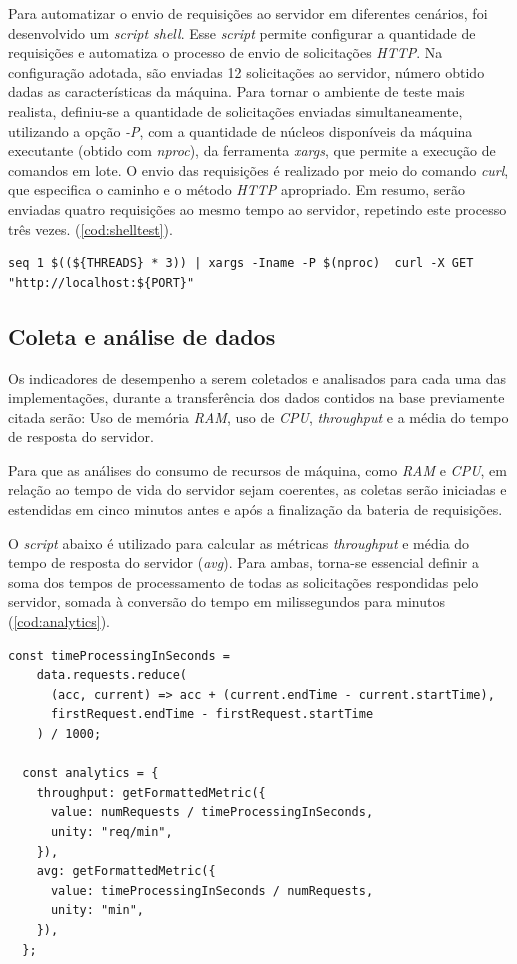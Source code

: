 \documentclass[12pt]{article}
\begin{document}
Para automatizar o envio de requisições ao servidor em diferentes cenários, 
foi desenvolvido um \textit{script shell}. Esse \textit{script} permite configurar a quantidade de 
requisições e automatiza o processo de envio de solicitações \textit{HTTP}. Na configuração adotada,
são enviadas 12 solicitações ao servidor, número obtido dadas as características da máquina. 
Para tornar o ambiente de teste mais realista, definiu-se a quantidade de solicitações enviadas simultaneamente, 
utilizando a opção \textit{-P}, com a quantidade de núcleos disponíveis da máquina executante (obtido com \textit{nproc}), 
da ferramenta \textit{xargs}, que permite a execução de comandos em lote. O envio 
das requisições é realizado por meio do comando \textit{curl}, que especifica o caminho e o método \textit{HTTP} apropriado.
Em resumo, serão enviadas quatro requisições ao mesmo tempo ao servidor, repetindo este processo três vezes. (\autoref{cod:shelltest}).

\begin{lstlisting}[caption={\textit{Script} para disparo de requisições}, label=cod:shelltest]
	seq 1 $((${THREADS} * 3)) | xargs -Iname -P $(nproc)  curl -X GET "http://localhost:${PORT}"
\end{lstlisting}


\subsection{Coleta e análise de dados}

Os indicadores de desempenho a serem coletados e analisados para cada uma das implementações, durante a transferência
dos dados contidos na base previamente citada serão: Uso de memória \textit{RAM}, uso de \textit{CPU}, \textit{throughput}
e a média do tempo de resposta do servidor.

Para que as análises do consumo de recursos de máquina, como \textit{RAM} e \textit{CPU}, em relação
ao tempo de vida do servidor sejam coerentes, as coletas serão iniciadas e estendidas em cinco 
minutos antes e após a finalização da bateria de requisições.

O \textit{script} abaixo é utilizado para calcular as métricas \textit{throughput} e 
média do tempo de resposta do servidor (\textit{avg}). Para ambas, torna-se essencial definir a soma dos tempos de processamento de
todas as solicitações respondidas pelo servidor, somada à conversão do tempo em milissegundos para minutos (\autoref{cod:analytics}).

\begin{lstlisting}[caption={Implementação do cálculo das métricas \textit{throughput} e média do tempo de resposta}, label=cod:analytics]
	const timeProcessingInSeconds =
    data.requests.reduce(
      (acc, current) => acc + (current.endTime - current.startTime),
      firstRequest.endTime - firstRequest.startTime
    ) / 1000;

  const analytics = {
    throughput: getFormattedMetric({
      value: numRequests / timeProcessingInSeconds,
      unity: "req/min",
    }),
    avg: getFormattedMetric({
      value: timeProcessingInSeconds / numRequests,
      unity: "min",
    }),
  };
\end{lstlisting}
\end{document}
